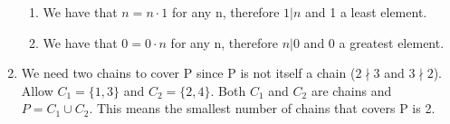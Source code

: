 \documentclass{article}
\begin{document}
\begin{enumerate}
\begin{enumerate}[label=\arabic*)]
                \item We have that $ n = n \cdot 1$ for any n, therefore $1|n$ and 1 a least element.
                \item We have that $ 0 = 0 \cdot n$ for any n, therefore $n|0$ and 0 a greatest element.
            \end{enumerate}
        \item We need two chains to cover P since P is not itself a chain ($2\nmid 3$ and $3\nmid 2$). Allow $C_1 = \{1,3\}$ and $C_2 = \{2,4\}$. Both $C_1$ and $C_2$ are chains and $P=C_1\cup C_2$. This means the smallest number of chains that covers P is 2. 
    \end{enumerate}
\end{document}
